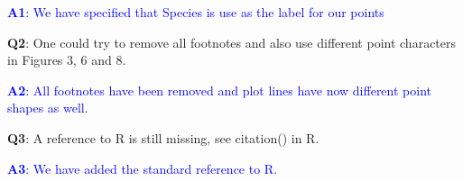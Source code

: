 \documentclass[]{article}
\begin{document}
\textcolor{blue}{\textbf{A1}: We have specified that Species is use as the label for our points}

\vspace{3mm}

	\textbf{Q2}: One could try to remove all footnotes and also use different point characters in Figures 3, 6 and 8.
	
\textcolor{blue}{\textbf{A2}: All footnotes have been removed and plot lines have now different point shapes as well}.

\vspace{3mm}

	\textbf{Q3}: A reference to R is still missing, see citation() in R.
	
\textcolor{blue}
{\textbf{A3}: We have added the standard reference to R.}

	

	
\end{document}
